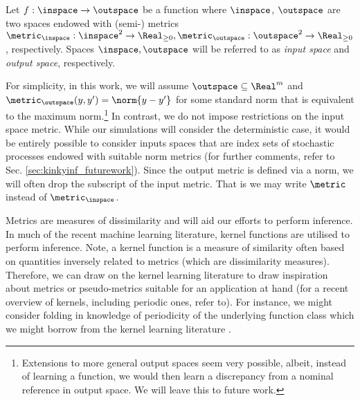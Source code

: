 Let $f: \inspace \to \outspace$ be a function where $\inspace$, $\outspace$ are two spaces endowed with (semi-) metrics $\metric_{\inspace}: \inspace^2 \to \Real_{\geq 0}, \metric_\outspace:\outspace^2 \to \Real_{\geq 0}$, respectively. Spaces $\inspace, \outspace$ will be referred to as \textit{input space} and \textit{output space}, respectively. 

For simplicity, in this work, we will assume $\outspace \subseteq \Real^m$ and $\metric_{\outspace}(y,y') = \norm{y-y'}$ for some standard norm that is equivalent to the maximum norm.\footnote{Extensions to more general output spaces seem very possible, albeit, instead of learning a function, we would then learn a discrepancy from a nominal reference in output space. We will leave this to future work.}
In contrast, we do not impose restrictions on the input space metric. While our simulations will consider the deterministic case, it would be entirely possible to consider inputs spaces that are index sets of stochastic processes endowed with suitable norm metrics (for further comments, refer to Sec. \ref{sec:kinkyinf_futurework}). Since the output metric is defined via a norm, we will often drop the subscript of the input metric. That is we may write $\metric$ instead of $\metric_\inspace$.


\begin{rem}
Metrics are measures of dissimilarity and will aid our efforts to perform inference.
In much of the recent machine learning literature, kernel functions are utilised to perform inference.
Note, a kernel function is a measure of similarity often based on quantities inversely related to metrics (which are dissimilarity measures). Therefore, we can draw on the kernel learning literature to draw inspiration about metrics or pseudo-metrics suitable for an application at hand (for a recent overview of kernels, including periodic ones, refer to\cite{duvenaud2014}). 
For instance, we might consider folding in knowledge of periodicity of the underlying function class which we might borrow from the kernel learning literature \cite{duvenaud2014}.
\end{rem}


